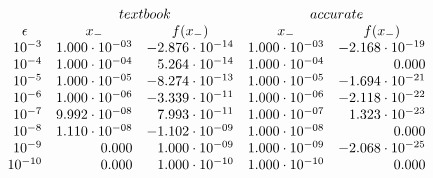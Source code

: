 \begin{comment}
\begin{exercise}
  Explore computing the roots of
  \begin{equation}
    \epsilon x^2 -(1+\epsilon^2)x + \epsilon
  \end{equation}
  by the `textbook' method and as described above.
  \begin{itemize}
  \item What are the roots?
  \item Why does the textbook method compute one root as zero,
    for $\epsilon$ small enough? Can you think of an example where this
    is very bad?
  \item What are the computed function values in both methods? Relative errors?
  \end{itemize}
\end{exercise}
\end{comment}

\begin{equation}
  \begin{array}{rrrrr}
    &\multicolumn{2}{c}{textbook}&\multicolumn{2}{c}{accurate}\\
    \multicolumn{1}{c}{\epsilon} &\multicolumn{1}{c}{x_-} &\multicolumn{1}{c}{f(x_-)} &\multicolumn{1}{c}{x_-} &\multicolumn{1}{c}{f(x_-)}\\
    10^{-3}& 1.000\cdot 10^{-03}& -2.876\cdot 10^{-14}&  1.000\cdot 10^{-03}&  -2.168\cdot 10^{-19}\\
    10^{-4}& 1.000\cdot 10^{-04}&  5.264\cdot 10^{-14}&  1.000\cdot 10^{-04}&   0.000\\
    10^{-5}& 1.000\cdot 10^{-05}& -8.274\cdot 10^{-13}&  1.000\cdot 10^{-05}&  -1.694\cdot 10^{-21}\\
    10^{-6}& 1.000\cdot 10^{-06}& -3.339\cdot 10^{-11}&  1.000\cdot 10^{-06}&  -2.118\cdot 10^{-22}\\
    10^{-7}& 9.992\cdot 10^{-08}&  7.993\cdot 10^{-11}&  1.000\cdot 10^{-07}&   1.323\cdot 10^{-23}\\
    10^{-8}&  1.110\cdot 10^{-08}& -1.102\cdot 10^{-09}&  1.000\cdot 10^{-08}&   0.000\\
    10^{-9}&  0.000&  1.000\cdot 10^{-09}&  1.000\cdot 10^{-09}&  -2.068\cdot 10^{-25}\\
    10^{-10}& 0.000&  1.000\cdot 10^{-10}&  1.000\cdot 10^{-10}&   0.000\\
  \end{array}
\end{equation}


